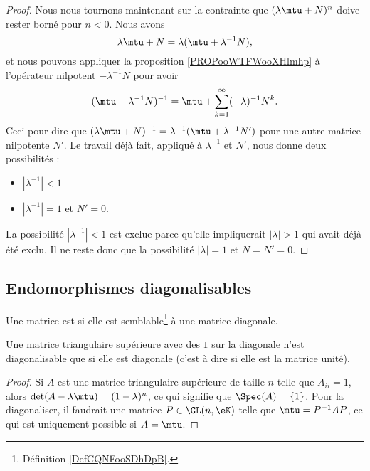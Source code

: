 \begin{proof}
    Nous nous tournons maintenant sur la contrainte que \( (\lambda\mtu+N)^n\) doive rester borné pour \( n<0\). Nous avons
    \begin{equation}
        \lambda\mtu+N=\lambda(\mtu+\lambda^{-1}N),
    \end{equation}
    et nous pouvons appliquer la proposition \ref{PROPooWTFWooXHlmhp} à l'opérateur nilpotent \( -\lambda^{-1} N\) pour avoir
    \begin{equation}
        (\mtu+\lambda^{-1}N)^{-1}=\mtu+\sum_{k=1}^{\infty}(-\lambda)^{-1}N^k.
    \end{equation}
    Ceci pour dire que \( (\lambda\mtu+N)^{-1}=\lambda^{-1}(\mtu+\lambda^{-1}N')\) pour une autre matrice nilpotente \( N'\). Le travail déjà fait, appliqué à \( \lambda^{-1}\) et \( N'\), nous donne deux possibilités :
    \begin{itemize}
        \item \( | \lambda^{-1} |<1\)
        \item \( | \lambda^{-1} |=1\) et \( N'=0\).
    \end{itemize}
    La possibilité \( | \lambda^{-1} |<1\) est exclue parce qu'elle impliquerait \( | \lambda |>1\) qui avait déjà été exclu. Il ne reste donc que la possibilité \( | \lambda |=1\) et \( N=N'=0\).
\end{proof}

\subsection{Endomorphismes diagonalisables}

\begin{definition}  \label{DefCNJqsmo}
    Une matrice est  si elle est semblable\footnote{Définition \ref{DefCQNFooSDhDpB}.} à une matrice diagonale.
\end{definition}

\begin{lemma}
    Une matrice triangulaire supérieure avec des \( 1\) sur la diagonale n'est diagonalisable que si elle est diagonale (c'est à dire si elle est la matrice unité).
\end{lemma}

\begin{proof}
    Si \( A\) est une matrice triangulaire supérieure de taille \( n\) telle que \( A_{ii}=1\), alors \( \det(A-\lambda\mtu)=(1-\lambda)^n\), ce qui signifie que \( \Spec(A)=\{ 1 \}\). Pour la diagonaliser, il faudrait une matrice \( P\in\GL(n,\eK)\) telle que \( \mtu=P^{-1}AP\), ce qui est uniquement possible si \( A=\mtu\).
\end{proof}


